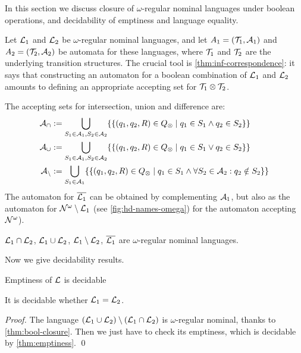\newcommand{\compl}[1]{\overline{#1}}
 
In this section we discuss closure of $\omega$-regular nominal languages under boolean operations, and decidability of emptiness and language equality.

Let $\mathcal{L}_1$ and $\mathcal{L}_2$ be $\omega$-regular nominal languages, and let $A_1 = (\mathcal{T}_1,\mathcal{A}_1)$  and $A_2 = (\mathcal{T}_2,\mathcal{A}_2)$ be automata for these languages, where $\mathcal{T}_1$ and $\mathcal{T}_2$ are the underlying transition structures.
The crucial tool is \cref{thm:inf-correspondence}: it says that constructing an automaton for a boolean combination of $\mathcal{L}_1$ and $\mathcal{L}_2$ amounts to defining an appropriate accepting set for $\mathcal{T}_1 \otimes \mathcal{T}_2$.

The accepting sets for intersection, union and difference are:
%
\begin{align*}
	\mathcal{A}_\cap &:= \bigcup_{S_1 \in \mathcal{A}_1,S_2 \in \mathcal{A}_2 } \{\{ (q_1,q_2,R) \in Q_{\otimes} \mid q_1 \in S_1 \land q_2 \in S_2 \}\} 
	\\
	\mathcal{A}_\cup &:= \bigcup_{S_1 \in \mathcal{A}_1,S_2 \in \mathcal{A}_2 } \{\{(q_1,q_2,R) \in Q_{\otimes} \mid q_1 \in S_1 \lor q_2 \in S_2 \}\} 
	\\
	\mathcal{A}_{\setminus} &:= \bigcup_{S_1 \in \mathcal{A}_1} \{\{ (q_1,q_2,R) \in Q_{\otimes} \mid q_1 \in S_1 \land \forall S_2 \in \mathcal{A}_2 : q_2 \notin S_2 \}\}
\end{align*}
%
The automaton for $\compl{\Lang_1}$ can be obtained by complementing $\mathcal{A}_1$, but also as the automaton for $\mathcal{N}^\omega \setminus \mathcal{L}_1$ (see \cref{fig:hd-names-omega}) for the automaton accepting $\mathcal{N}^\omega$).


\begin{theorem}
$\mathcal{L}_1 \cap \mathcal{L}_2$, $\mathcal{L}_1 \cup \mathcal{L}_2$, $\mathcal{L}_1 \setminus \mathcal{L}_2$, $\compl{\Lang_1}$ are $\omega$-regular nominal languages.
\label{thm:bool-closure}
\end{theorem}
Now we give decidability results.
%
\begin{theorem}
Emptiness of $\mathcal{L}$ is decidable
\label{thm:emptiness}
\end{theorem}

\begin{theorem}
It is decidable whether $\mathcal{L}_1 = \mathcal{L}_2$.
\end{theorem}

\begin{proof}
The language $(\mathcal{L}_1 \cup \mathcal{L}_2) \setminus (\mathcal{L}_1 \cap \mathcal{L}_2 )$ is $\omega$-regular nominal, thanks to \cref{thm:bool-closure}. Then we just have to check its emptiness, which is decidable by \cref{thm:emptiness}.
\qed
\end{proof}
